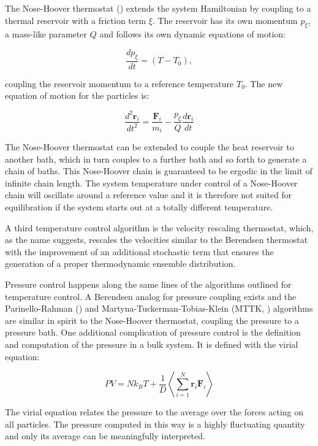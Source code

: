 \documentclass[english, a4paper, 12pt, titlepage, draft]{article}
\newcommand{\vect}[1]{\mathbf{#1}}
\begin{document}
The Nose-Hoover thermostat (\cite{Nose, Hoover}) extends the system Hamiltonian by coupling to a thermal reservoir with a friction term $\xi$.
The reservoir has its own momentum $p_{\xi}$, a mass-like parameter $Q$ and follows its own dynamic equations of motion:

\begin{equation}
    \frac{dp_{\xi}}{dt} = (T-T_0),
\end{equation}

coupling the reservoir momentum to a reference temperature $T_0$.
The new equation of motion for the particles is:

\begin{equation}
    \frac{d^2\vect{r}_i}{dt^2} = \frac{\vect{F}_i}{m_i} - \frac{p_{\xi}}{Q} \frac{d\vect{r}_i}{dt}
\end{equation}

The Nose-Hoover thermostat can be extended to couple the heat reservoir to another bath, which in turn couples to a further bath and so forth to generate a chain of baths.
This Nose-Hoover chain is guaranteed to be ergodic in the limit of infinite chain length.
The system temperature under control of a Nose-Hoover chain will oscillate around a reference value and it is therefore not suited for equilibration if the system starts out at a totally different temperature.

A third temperature control algorithm is the velocity rescaling thermostat, which, as the name suggests, rescales the velocities similar to the Berendsen thermostat with the improvement of an additional stochastic term that ensures the generation of a proper thermodynamic ensemble distribution.

Pressure control happens along the same lines of the algorithms outlined for temperature control.
A Berendsen analog for pressure coupling exists and the Parinello-Rahman (\cite{ParrinelloRahman}) and Martyna-Tuckerman-Tobias-Klein (MTTK, \cite{MTTK}) algorithms are similar in spirit to the Nose-Hoover thermostat, coupling the pressure to a pressure bath.
One additional complication of pressure control is the definition and computation of the pressure in a bulk system.
It is defined with the virial equation:

\begin{equation}
    PV = Nk_BT + \frac{1}{D} \left< \sum^N_{i=1}\vect{r}_i \vect{F}_i \right>
\end{equation}

The virial equation relates the pressure to the average over the forces acting on all particles.
The pressure computed in this way is a highly fluctuating quantity and only its average can be meaningfully interpreted.
\end{document}
